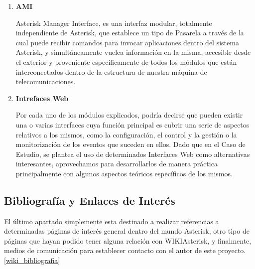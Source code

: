 \begin{enumerate}
	\item \textbf{AMI}
	
	Asterisk Manager Interface, es una interfaz modular, totalmente independiente de Asterisk, que establece un tipo de Pasarela a través de la cual puede recibir comandos para invocar aplicaciones dentro del sistema Asterisk, y simultáneamente vuelca información en la misma, accesible desde el exterior y proveniente específicamente de todos los módulos que están interconectados dentro de la estructura de nuestra máquina de telecomunicaciones.
	
	\item \textbf{Intrefaces Web}
	
	Por cada uno de los módulos explicados, podría decirse que pueden existir una o varias interfaces cuya función principal es cubrir una serie de aspectos relativos a los mismos, como la configuración, el control y la gestión o la monitorización de los eventos que suceden en ellos. Dado que en el Caso de Estudio, se plantea el uso de determinados Interfaces Web como alternativas interesantes, aprovechamos para desarrollarlos de manera práctica principalmente con algunos aspectos teóricos específicos de los mismos.
	
\end{enumerate}


\subsection{Bibliografía y Enlaces de Interés}

El último apartado simplemente esta destinado a realizar referencias a determinadas páginas de interés general dentro del mundo Asterisk, otro tipo de páginas que hayan podido tener alguna relación con WIKIAsterisk, y finalmente, medios de comunicación para establecer contacto con el autor de este proyecto. \ref{wiki_bibliografia}

